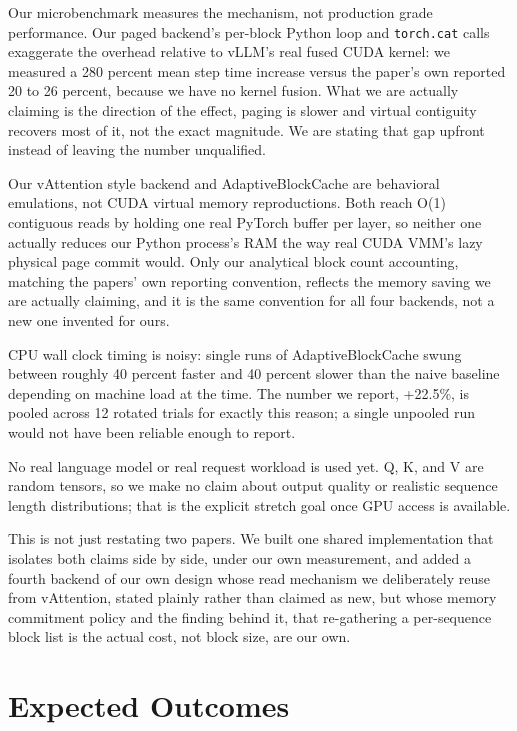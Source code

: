 \documentclass[lettersize,journal]{IEEEtran}
\begin{document}
Our microbenchmark measures the mechanism, not production grade performance. Our paged backend's per-block Python loop and \texttt{torch.cat} calls exaggerate the overhead relative to vLLM's real fused CUDA kernel: we measured a 280 percent mean step time increase versus the paper's own reported 20 to 26 percent, because we have no kernel fusion. What we are actually claiming is the direction of the effect, paging is slower and virtual contiguity recovers most of it, not the exact magnitude. We are stating that gap upfront instead of leaving the number unqualified.

Our vAttention style backend and AdaptiveBlockCache are behavioral emulations, not CUDA virtual memory reproductions. Both reach O(1) contiguous reads by holding one real PyTorch buffer per layer, so neither one actually reduces our Python process's RAM the way real CUDA VMM's lazy physical page commit would. Only our analytical block count accounting, matching the papers' own reporting convention, reflects the memory saving we are actually claiming, and it is the same convention for all four backends, not a new one invented for ours.

CPU wall clock timing is noisy: single runs of AdaptiveBlockCache swung between roughly 40 percent faster and 40 percent slower than the naive baseline depending on machine load at the time. The number we report, +22.5\%, is pooled across 12 rotated trials for exactly this reason; a single unpooled run would not have been reliable enough to report.

No real language model or real request workload is used yet. Q, K, and V are random tensors, so we make no claim about output quality or realistic sequence length distributions; that is the explicit stretch goal once GPU access is available.

This is not just restating two papers. We built one shared implementation that isolates both claims side by side, under our own measurement, and added a fourth backend of our own design whose read mechanism we deliberately reuse from vAttention, stated plainly rather than claimed as new, but whose memory commitment policy and the finding behind it, that re-gathering a per-sequence block list is the actual cost, not block size, are our own.

\section{Expected Outcomes}
\end{document}
